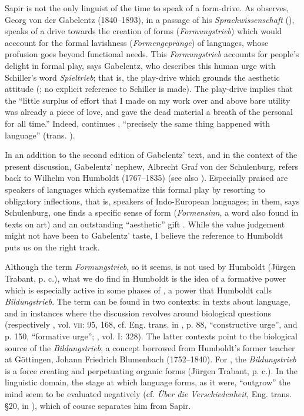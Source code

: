 \documentclass[output=paper]{langscibook}
\begin{document}
Sapir is not the only linguist of the time to speak of a form-drive. As \citet{McElvenny2016} observes, Georg von der Gabelentz (1840--1893), in a passage of his \emph{Sprachwissenschaft} (\citeyear{Gabelentz20161891}), speaks of a drive towards the creation of forms (\emph{Formungs\-trieb}) which would acccount for the formal lavishness (\emph{Formengeprän\-ge}) of languages, whose profusion goes beyond functional needs. This \emph{Formungs\-trieb} accounts for people's delight in formal play, says Gabelentz, who describes this human urge with Schiller's word \emph{Spieltrieb}; that is, the play-drive which grounds the aesthetic attitude (\citealt[381]{Gabelentz20161891}; no explicit reference to Schiller is made). The play-drive implies that the ``little surplus of effort that I made on my work over and above bare utility was already a piece of love, and gave the dead material a breath of the personal for all time.'' Indeed, continues \citet[344]{Gabelentz20161891}, ``precisely the same thing happened with language'' (trans. \citealt[35]{McElvenny2016}).

In an addition to the second edition of Gabelentz' text, and in the context of the present discussion, Gabelentz' nephew, Albrecht Graf von der Schulenburg, refers back to Wilhelm von Humboldt (1767--1835) (see also \citealt{McElvenny2017a}). Especially praised are speakers of languages which systematize this formal play by resorting to obligatory inflections, that is, speakers of Indo-European languages; in them, says Schulenburg, one finds a specific sense of form (\emph{Formensinn}, a word also found in texts on art) and an outstanding ``aesthetic'' gift \citep[394]{Gabelentz20161891}. While the value judgement might not have been to Gabelentz' taste, I believe the reference to Humboldt puts us on the right track.

Although the term \emph{Formungstrieb}, so it seems, is not used by Humboldt (Jürgen Trabant, p. c.), what we do find in Humboldt is the idea of a formative power which is especially active in some phases of , a power that Humboldt calls \emph{Bildungstrieb}. The term can be found in two contexts: in texts about language, and in instances where the discussion revolves around biological questions (respectively \citealt{Humboldt1907}, vol. \textsc{vii}: 95, 168, cf. Eng. trans. in \citealt{Humboldt1988}, p. 88, ``constructive urge'', and p. 150, ``formative urge''; \citealt{Humboldt1903}, vol. I: 328). The latter contexts point to the biological source of the \emph{Bildungstrieb}, a concept borrowed from Humboldt's former teacher at Göttingen, Johann Friedrich Blumenbach (1752--1840). For \citet{Blumenbach1781}, the \emph{Bildungstrieb} is a force creating and perpetuating organic forms (Jürgen Trabant, p. c.). In the linguistic domain, the stage at which language forms, as it were, ``outgrow'' the mind seem to be evaluated negatively (cf. \emph{Über die Verschiedenheit}, Eng. trans. §20, in \citealt{Humboldt1988}), which of course separates him from Sapir.
\end{document}
